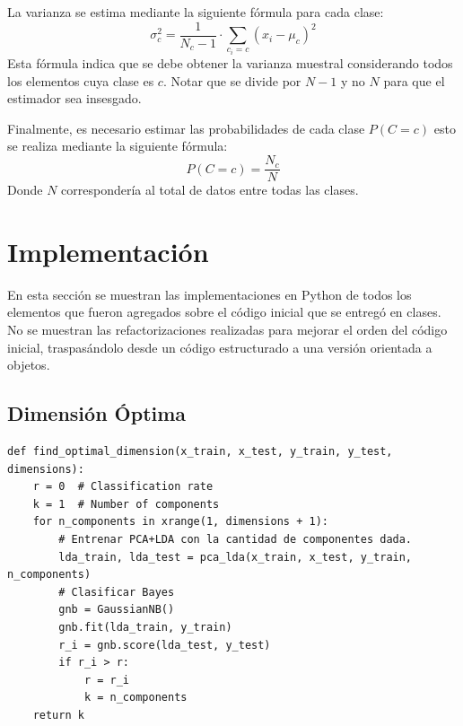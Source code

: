 \documentclass[letter, titlepage, 10pt]{article}
\begin{document}
La varianza se estima mediante la siguiente fórmula para cada clase:
\begin{equation}
\sigma_c^2 = \frac{1}{N_c-1}\cdot \sum\limits_{c_i = c}{(x_i-\mu_c)^2}
\end{equation}
Esta fórmula indica que se debe obtener la varianza muestral considerando todos los elementos cuya clase es $c$. Notar que se divide por $N-1$ y no $N$ para que el estimador sea insesgado.

Finalmente, es necesario estimar las probabilidades de cada clase $P(C = c)$ esto se realiza mediante la siguiente fórmula:
\begin{equation}
P(C = c) = \frac{N_c}{N}
\end{equation}
Donde $N$ correspondería al total de datos entre todas las clases.


\newpage

\section{Implementación}

En esta sección se muestran las implementaciones en Python de todos los elementos que fueron agregados sobre el código inicial que se entregó en clases. No se muestran las refactorizaciones realizadas para mejorar el orden del código inicial, traspasándolo desde un código estructurado a una versión orientada a objetos. 


\subsection{Dimensión Óptima}
\begin{lstlisting}
def find_optimal_dimension(x_train, x_test, y_train, y_test, dimensions):
    r = 0  # Classification rate
    k = 1  # Number of components
    for n_components in xrange(1, dimensions + 1):
        # Entrenar PCA+LDA con la cantidad de componentes dada.
        lda_train, lda_test = pca_lda(x_train, x_test, y_train, n_components)
        # Clasificar Bayes
        gnb = GaussianNB()
        gnb.fit(lda_train, y_train)
        r_i = gnb.score(lda_test, y_test)
        if r_i > r:
            r = r_i
            k = n_components
    return k
\end{lstlisting}
\end{document}
